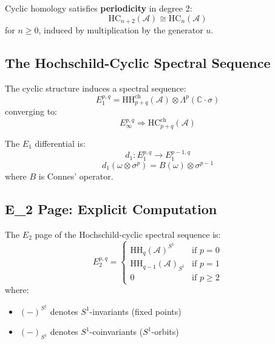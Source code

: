 \begin{corollary}
\label{cor:connes-periodicity}
Cyclic homology satisfies \textbf{periodicity} in degree 2:
$$\text{HC}_{n+2}(\mathcal{A}) \cong \text{HC}_n(\mathcal{A})$$
for $n \geq 0$, induced by multiplication by the generator $u$.
\end{corollary}

\subsection{The Hochschild-Cyclic Spectral Sequence}

\begin{theorem}
\label{thm:HC-spectral-sequence}
The cyclic structure induces a spectral sequence:
$$E_1^{p,q} = \text{HH}_{p+q}^{\text{ch}}(\mathcal{A}) \otimes \Lambda^p(\mathbb{C} \cdot \sigma)$$
converging to:
$$E_\infty^{p,q} \Rightarrow \text{HC}_{p+q}^{\text{ch}}(\mathcal{A})$$

The $E_1$ differential is:
$$d_1: E_1^{p,q} \to E_1^{p-1,q}$$
$$d_1(\omega \otimes \sigma^p) = B(\omega) \otimes \sigma^{p-1}$$
where $B$ is Connes' operator.
\end{theorem}

\subsection{E_2 Page: Explicit Computation}

\begin{theorem}
\label{thm:E2-page-formula}
The $E_2$ page of the Hochschild-cyclic spectral sequence is:
$$E_2^{p,q} = \begin{cases}
\text{HH}_q(\mathcal{A})^{S^1} & \text{if } p = 0 \\
\text{HH}_{q-1}(\mathcal{A})_{S^1} & \text{if } p = 1 \\
0 & \text{if } p \geq 2
\end{cases}$$
where:
\begin{itemize}
\item $(-)^{S^1}$ denotes $S^1$-invariants (fixed points)
\item $(-)_{S^1}$ denotes $S^1$-coinvariants ($S^1$-orbits)
\end{itemize}
\end{theorem}

